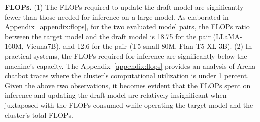 {\bf FLOPs.}
(1) The FLOPs required to update the draft model are significantly fewer than those needed for inference on a large model. 
As elaborated in Appendix~\ref{appendix:flops}, for the two evaluated model pairs, 
the FLOPs ratio between the target model and the draft model is 18.75 for the pair (LLaMA-160M, Vicuna7B), and 12.6 for the pair (T5-small 80M, Flan-T5-XL 3B). 
(2) In practical systems, the FLOPs required for inference are significantly below the machine's capacity.
The Appendix~\ref{appendix:flops} provides an analysis of Arena chatbot traces where the cluster's computational utilization is under 1 percent. %
Given the above two observations, it becomes evident that the FLOPs spent on inference and updating the draft model are relatively 
insignificant when juxtaposed with the FLOPs consumed while operating the target model and the cluster's total FLOPs.







